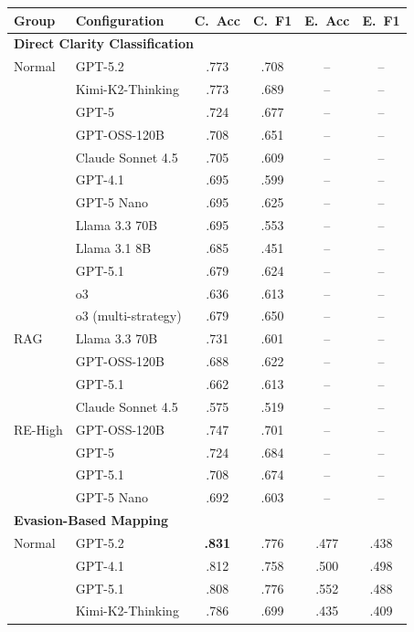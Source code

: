 \documentclass[11pt]{article}
\begin{document}
\begin{table}[p]
\centering
\scriptsize
\begin{tabular*}{\textwidth}{@{\extracolsep{\fill}}llcccc@{}}
\toprule
\textbf{Group} & \textbf{Configuration} & \textbf{C.~Acc} & \textbf{C.~F1} & \textbf{E.~Acc} & \textbf{E.~F1} \\
\midrule
\multicolumn{6}{l}{\textbf{Direct Clarity Classification}} \\
\midrule
Normal & GPT-5.2 & .773 & .708 & -- & -- \\
 & Kimi-K2-Thinking & .773 & .689 & -- & -- \\
 & GPT-5 & .724 & .677 & -- & -- \\
 & GPT-OSS-120B & .708 & .651 & -- & -- \\
 & Claude Sonnet 4.5 & .705 & .609 & -- & -- \\
 & GPT-4.1 & .695 & .599 & -- & -- \\
 & GPT-5 Nano & .695 & .625 & -- & -- \\
 & Llama 3.3 70B & .695 & .553 & -- & -- \\
 & Llama 3.1 8B & .685 & .451 & -- & -- \\
 & GPT-5.1 & .679 & .624 & -- & -- \\
 & o3 & .636 & .613 & -- & -- \\
 & o3 (multi-strategy) & .679 & .650 & -- & -- \\
\addlinespace
RAG & Llama 3.3 70B & .731 & .601 & -- & -- \\
 & GPT-OSS-120B & .688 & .622 & -- & -- \\
 & GPT-5.1 & .662 & .613 & -- & -- \\
 & Claude Sonnet 4.5 & .575 & .519 & -- & -- \\
\addlinespace
RE-High & GPT-OSS-120B & .747 & .701 & -- & -- \\
 & GPT-5 & .724 & .684 & -- & -- \\
 & GPT-5.1 & .708 & .674 & -- & -- \\
 & GPT-5 Nano & .692 & .603 & -- & -- \\
\midrule
\multicolumn{6}{l}{\textbf{Evasion-Based Mapping}} \\
\midrule
Normal & GPT-5.2 & \textbf{.831} & .776 & .477 & .438 \\
 & GPT-4.1 & .812 & .758 & .500 & .498 \\
 & GPT-5.1 & .808 & .776 & .552 & .488 \\
 & Kimi-K2-Thinking & .786 & .699 & .435 & .409 \\

\end{tabular*}
\end{table}
\end{document}
